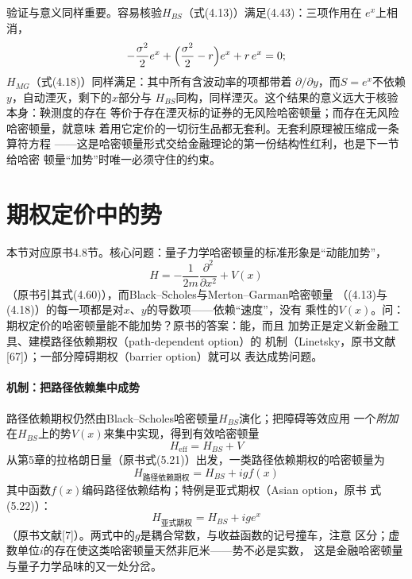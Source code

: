 验证与意义同样重要。容易核验$H_{BS}$（式(4.13)）满足(4.43)：三项作用在
$e^{x}$上相消，
\begin{equation*}
-\frac{\sigma^{2}}{2}e^{x}
+\Bigl(\frac{\sigma^{2}}{2}-r\Bigr)e^{x}+r\,e^{x}=0;
\end{equation*}
$H_{MG}$（式(4.18)）同样满足：其中所有含波动率的项都带着
$\partial/\partial y$，而$S=e^{x}$不依赖$y$，自动湮灭，剩下的$x$部分与
$H_{BS}$同构，同样湮灭。这个结果的意义远大于核验本身：鞅测度的存在
等价于存在湮灭标的证券的无风险哈密顿量；而存在无风险哈密顿量，就意味
着用它定价的一切衍生品都无套利。无套利原理被压缩成一条算符方程
——这是哈密顿量形式交给金融理论的第一份结构性红利，也是下一节给哈密
顿量“加势”时唯一必须守住的约束。

\section{期权定价中的势}

本节对应原书4.8节。核心问题：量子力学哈密顿量的标准形象是“动能加势”，
\begin{equation*}
H=-\frac{1}{2m}\frac{\partial^{2}}{\partial x^{2}}+V(x)
\end{equation*}
（原书引其式(4.60)），而Black--Scholes与Merton--Garman哈密顿量
（(4.13)与(4.18)）的每一项都是对$x$、$y$的导数项——依赖“速度”，没有
乘性的$V(x)$。问：期权定价的哈密顿量能不能加势？原书的答案：能，而且
加势正是定义新金融工具、建模路径依赖期权（path-dependent option）的
机制（Linetsky，原书文献[67]）；一部分障碍期权（barrier option）就可以
表达成势问题。

\paragraph{机制：把路径依赖集中成势}
路径依赖期权仍然由Black--Scholes哈密顿量$H_{BS}$演化；把障碍等效应用
一个\emph{附加}在$H_{BS}$上的势$V(x)$来集中实现，得到有效哈密顿量
\begin{equation*}
H_{\mathrm{eff}}=H_{BS}+V
\end{equation*}
从第5章的拉格朗日量（原书式(5.21)）出发，一类路径依赖期权的哈密顿量为
\begin{equation*}
H_{\text{路径依赖期权}}=H_{BS}+igf(x)
\end{equation*}
其中函数$f(x)$编码路径依赖结构；特例是亚式期权（Asian option，原书
式(5.22)）：
\begin{equation*}
H_{\text{亚式期权}}=H_{BS}+ige^{x}
\end{equation*}
（原书文献[7]）。两式中的$g$是耦合常数，与收益函数的记号撞车，注意
区分；虚数单位$i$的存在使这类哈密顿量天然非厄米——势不必是实数，
这是金融哈密顿量与量子力学品味的又一处分岔。

